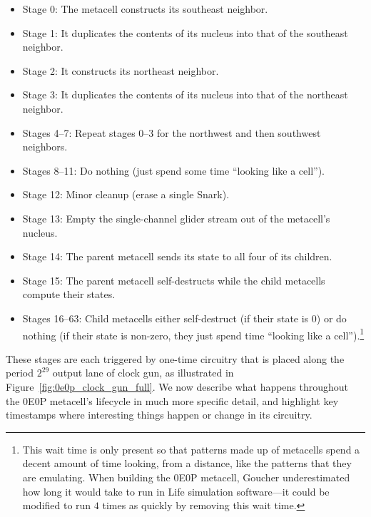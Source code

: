 \begin{itemize}
	\item Stage 0: The metacell constructs its southeast neighbor.\smallskip
	
	\item Stage 1: It duplicates the contents of its nucleus into that of the southeast neighbor.\smallskip
	
	\item Stage 2: It constructs its northeast neighbor.\smallskip
	
	\item Stage 3: It duplicates the contents of its nucleus into that of the northeast neighbor.\smallskip
	
	\item Stages 4--7: Repeat stages 0--3 for the northwest and then southwest neighbors.\smallskip
	
	\item Stages 8--11: Do nothing (just spend some time ``looking like a cell'').\smallskip
	
	\item Stage 12: Minor cleanup (erase a single Snark).\smallskip
	
	\item Stage 13: Empty the single-channel glider stream out of the metacell's nucleus.\smallskip
	
	\item Stage 14: The parent metacell sends its state to all four of its children.\smallskip
	
	\item Stage 15: The parent metacell self-destructs while the child metacells compute their states.\smallskip
	
	\item Stages 16--63: Child metacells either self-destruct (if their state is $0$) or do nothing (if their state is non-zero, they just spend time ``looking like a cell'').\footnote{This wait time is only present so that patterns made up of metacells spend a decent amount of time looking, from a distance, like the patterns that they are emulating. When building the 0E0P metacell, Goucher underestimated how long it would take to run in Life simulation software---it could be modified to run $4$ times as quickly by removing this wait time.}\smallskip
\end{itemize}

These stages are each triggered by one-time circuitry that is placed along the period $2^{29}$ output lane of clock gun, as illustrated in Figure~\ref{fig:0e0p_clock_gun_full}. We now describe what happens throughout the 0E0P metacell's lifecycle in much more specific detail, and highlight key timestamps where interesting things happen or change in its circuitry.

